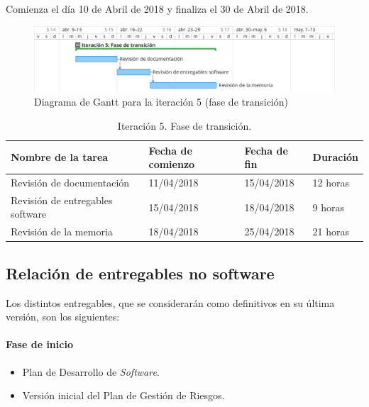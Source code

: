 \documentclass[twoside]{report}
\begin{document}
Comienza el día 10 de Abril de 2018 y finaliza el 30 de Abril de 2018.

\begin{figure}[h]
\begin{center}
\includegraphics[width=\textwidth]{images/gantt/ite5}
\caption{Diagrama de Gantt para la iteración 5 (fase de transición)}
\end{center}
\end{figure}


\begin{table}[H]
\centering
\begin{tabular}{|l|l|l|l|}
\hline
Nombre de la tarea              & Fecha de comienzo & Fecha de fin & Duración \\ \hline
Revisión de documentación       & 11/04/2018        & 15/04/2018   & 12 horas   \\ \hline
Revisión de entregables software & 15/04/2018        & 18/04/2018   & 9 horas   \\ \hline
Revisión de la memoria & 18/04/2018        & 25/04/2018   & 21 horas   \\ \hline
\end{tabular}
\caption{Iteración 5. Fase de transición.}
\end{table}

\subsection{Relación de entregables no software}

Los distintos entregables, que se considerarán como definitivos en su última versión, son los siguientes:

\paragraph{Fase de inicio\\}
\begin{itemize}
\item Plan de Desarrollo de \textit{Software}.
\item Versión inicial del Plan de Gestión de Riesgos.
\end{itemize}
\end{document}
